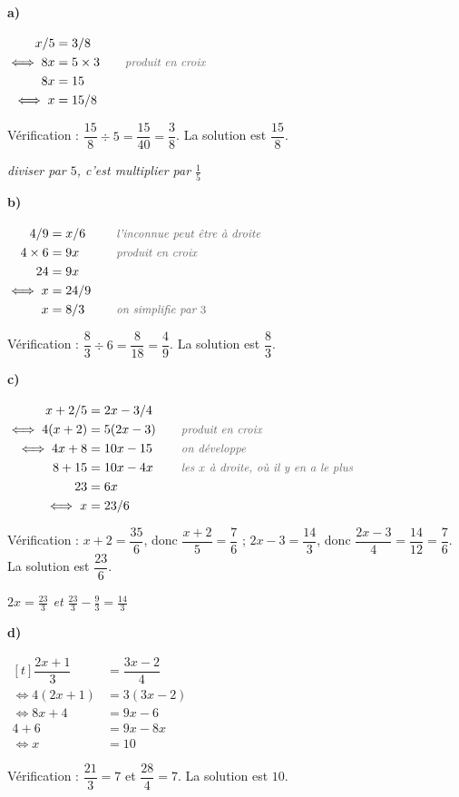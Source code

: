 \documentclass[11pt,a4paper]{article}
\newcounter{exo}
\newenvironment{exo}[1][\relax]{\refstepcounter{exo}\begin{exercice}[#1]}{\end{exercice}}
\newcommand{\res}[1]{{\color{coulRep}#1}}
\newenvironment{calculs}{\par\smallskip\noindent$\displaystyle\begin{aligned}[t]}%
  {\end{aligned}$\par\smallskip}
\newcommand{\justif}[1]{\quad\text{\small\itshape\color{black!60}#1}}
\newcommand{\cas}[1]{\par\smallskip\noindent\textbf{\color{coulExo}#1}\vadjust{\nobreak}}
\newcommand{\explique}[2]{\par\smallskip\noindent
  \begin{minipage}[t]{0.6\linewidth}\raggedright #1\end{minipage}\hfill
  \begin{minipage}[t]{0.37\linewidth}\raggedright\leavevmode
    {\small\itshape\color{black!60}#2}\end{minipage}\par}
\begin{document}
\begin{exo}[S'entraîner]
\cas{a)}
\begin{calculs}
\dfrac{x}{5} &= \dfrac{3}{8} &&\\
\iff 8x &= 5\times 3 &&\justif{produit en croix}\\
8x &= 15 &&\\
\iff x &= \dfrac{15}{8} &&
\end{calculs}
\explique{Vérification : $\dfrac{15}{8}\div 5=\dfrac{15}{40}=\dfrac{3}{8}$. La solution
est \res{$\dfrac{15}{8}$}.}{diviser par $5$, c'est multiplier par $\frac15$}
\cas{b)}
\begin{calculs}
\dfrac{4}{9} &= \dfrac{x}{6} &&\justif{l'inconnue peut être à droite}\\
4\times 6 &= 9x &&\justif{produit en croix}\\
24 &= 9x &&\\
\iff x &= \dfrac{24}{9} &&\\
x &= \dfrac{8}{3} &&\justif{on simplifie par $3$}
\end{calculs}
\explique{Vérification : $\dfrac{8}{3}\div 6=\dfrac{8}{18}=\dfrac{4}{9}$. La solution
est \res{$\dfrac{8}{3}$}.}{}
\cas{c)}
\begin{calculs}
\dfrac{x+2}{5} &= \dfrac{2x-3}{4} &&\\
\iff 4(x+2) &= 5(2x-3) &&\justif{produit en croix}\\
\iff 4x+8 &= 10x-15 &&\justif{on développe}\\
8+15 &= 10x-4x &&\justif{les $x$ à droite, où il y en a le plus}\\
23 &= 6x &&\\
\iff x &= \dfrac{23}{6} &&
\end{calculs}
\explique{Vérification : $x+2=\dfrac{35}{6}$, donc $\dfrac{x+2}{5}=\dfrac{7}{6}$ ;
$2x-3=\dfrac{14}{3}$, donc $\dfrac{2x-3}{4}=\dfrac{14}{12}=\dfrac{7}{6}$. La solution
est \res{$\dfrac{23}{6}$}.}{$2x=\frac{23}{3}$ et $\frac{23}{3}-\frac93=\frac{14}{3}$}
\cas{d)}
\begin{calculs}
\dfrac{2x+1}{3} &= \dfrac{3x-2}{4} &&\\
\iff 4(2x+1) &= 3(3x-2) &&\\
\iff 8x+4 &= 9x-6 &&\\
4+6 &= 9x-8x &&\\
\iff x &= 10 &&
\end{calculs}
\explique{Vérification : $\dfrac{21}{3}=7$ et $\dfrac{28}{4}=7$. La solution est
\res{$10$}.}{}
\end{exo}
\end{document}
